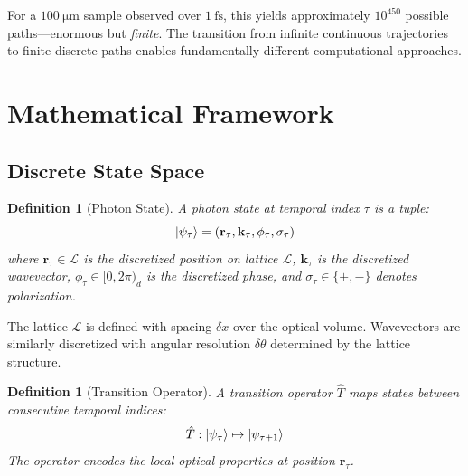 \documentclass[twocolumn,10pt,a4paper]{article}
\newtheorem{definition}[theorem]{Definition}
\begin{document}
For a $\SI{100}{\micro\meter}$ sample observed over $\SI{1}{\femto\second}$, this yields approximately $10^{450}$ possible paths---enormous but \emph{finite}. The transition from infinite continuous trajectories to finite discrete paths enables fundamentally different computational approaches.

\section{Mathematical Framework}

\subsection{Discrete State Space}

\begin{definition}[Photon State]
A photon state at temporal index $\tau$ is a tuple:
\begin{equation}
\ket{\psi_\tau} = (\mathbf{r}_\tau, \mathbf{k}_\tau, \phi_\tau, \sigma_\tau)
\end{equation}
where $\mathbf{r}_\tau \in \mathcal{L}$ is the discretized position on lattice $\mathcal{L}$, $\mathbf{k}_\tau$ is the discretized wavevector, $\phi_\tau \in [0, 2\pi)_d$ is the discretized phase, and $\sigma_\tau \in \{+, -\}$ denotes polarization.
\end{definition}

The lattice $\mathcal{L}$ is defined with spacing $\delta x$ over the optical volume. Wavevectors are similarly discretized with angular resolution $\delta\theta$ determined by the lattice structure.

\begin{definition}[Transition Operator]
A transition operator $\hat{T}$ maps states between consecutive temporal indices:
\begin{equation}
\hat{T}: \ket{\psi_\tau} \mapsto \ket{\psi_{\tau+1}}
\end{equation}
The operator encodes the local optical properties at position $\mathbf{r}_\tau$.
\end{definition}
\end{document}
